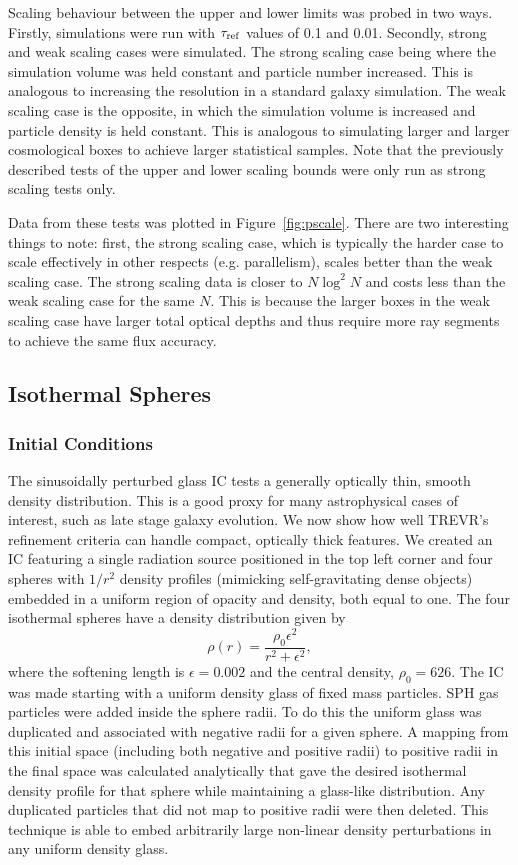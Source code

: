 \documentclass[fleq,usenatbib]{mnras}
\newcommand{\acro}{TREVR}
\newcommand{\tr}{\tau_{\rm ref}}
\begin{document}
{Scaling behaviour between the upper and lower limits was probed in two ways. 
Firstly, simulations were run with $\tr$ values of 0.1 and 0.01. Secondly, 
strong and weak scaling cases were simulated. The strong scaling case being 
where the simulation volume was held constant and particle number increased. 
This is analogous to increasing the resolution in a standard galaxy 
simulation. The weak scaling case is the opposite, in which the simulation 
volume is increased and particle density is held constant. This is analogous 
to simulating larger and larger cosmological boxes to achieve larger 
statistical samples. Note that the previously described tests of the upper and 
lower scaling bounds were only run as strong scaling tests only.

Data from these tests was plotted in Figure~\ref{fig:pscale}. 
There are two interesting things to note: first, the strong scaling case, 
which is typically the harder case to scale effectively in other respects 
(e.g. parallelism), scales better than the weak scaling case. The strong 
scaling data is closer to $N\log^2{N}$ and costs less than the weak scaling 
case for the same $N$. This is because the larger boxes in the weak scaling 
case have larger total optical depths and thus require more ray segments to 
achieve the same flux accuracy.

\subsection{Isothermal Spheres}\label{spheretest}
\subsubsection{Initial Conditions}
The sinusoidally perturbed glass IC tests a generally optically thin, smooth 
density distribution. This is a good proxy for many astrophysical cases of 
interest, such as late stage galaxy evolution. We now show how well \acro{}'s 
refinement criteria can handle compact, optically thick features. We created 
an IC featuring a single radiation source positioned in the top left corner 
and four spheres with $1/r^2$ density profiles (mimicking self-gravitating 
dense objects) embedded in a uniform region of opacity and density, both equal 
to one. The four isothermal spheres have a density distribution given by
\begin{equation}
\rho(r) = \frac{\rho_0 \epsilon^2}{r^2 + \epsilon^2},
\end{equation}
where the softening length is $\epsilon=0.002$ and the central density, 
$\rho_0=626$. The IC was made starting with a uniform density glass of fixed 
mass particles. SPH gas particles were added inside the sphere radii. To do 
this the uniform glass was duplicated and associated with negative radii for a 
given sphere. A mapping from this initial space (including both negative and 
positive radii) to positive radii in the final space was calculated 
analytically that gave the desired isothermal density profile for that sphere
while maintaining a glass-like distribution. Any duplicated particles that did 
not map to positive radii were then deleted. This technique is able to embed 
arbitrarily large non-linear density perturbations in any uniform density 
glass.

}
\end{document}
